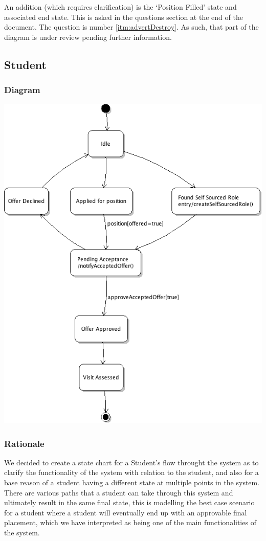 \documentclass[11pt]{article}
\begin{document}
An addition (which requires clarification) is the `Position Filled' state and
associated end state. This is asked in the questions section at the end of the
document. The question is number \ref{itm:advertDestroy}. As such, that part of 
the diagram is under review pending further information.

\subsection{Student}

\subsubsection{Diagram}

\includegraphics[width=\textwidth]{studentState.png}

\subsubsection{Rationale}

We decided to create a state chart for a Student's flow throught the
system as to clarify the functionality of the system with relation to
the student, and also for a base reason of a student having a
different state at multiple points in the system. There are various
paths that a student can take through this system and ultimately
result in the same final state, this is modelling the best case
scenario for a student where a student will eventually end up with an
approvable final placement, which we have interpreted as being one of
the main functionalities of the system. 
\end{document}
